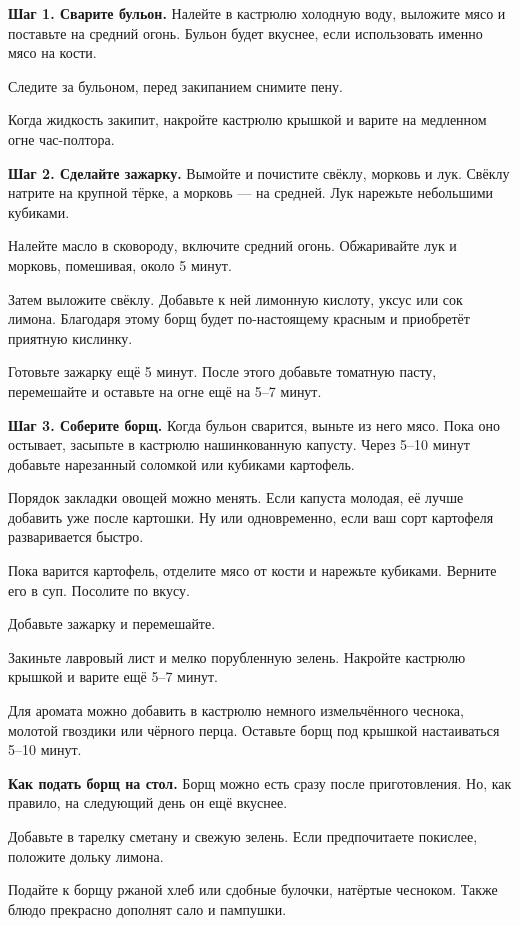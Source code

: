 \textbf{Шаг 1. Сварите бульон.} Налейте в кастрюлю холодную воду, выложите мясо и поставьте на средний огонь. Бульон будет вкуснее, если использовать именно мясо на кости.

Следите за бульоном, перед закипанием снимите пену.

Когда жидкость закипит, накройте кастрюлю крышкой и варите на медленном огне час-полтора.

\textbf{Шаг 2. Сделайте зажарку.}
Вымойте и почистите свёклу, морковь и лук. Свёклу натрите на крупной тёрке, а морковь — на средней. Лук нарежьте небольшими кубиками.

Налейте масло в сковороду, включите средний огонь. Обжаривайте лук и морковь, помешивая, около 5 минут.

Затем выложите свёклу. Добавьте к ней лимонную кислоту, уксус или сок лимона. Благодаря этому борщ будет по-настоящему красным и приобретёт приятную кислинку.

Готовьте зажарку ещё 5 минут. После этого добавьте томатную пасту, перемешайте и оставьте на огне ещё на 5–7 минут.

\textbf{Шаг 3. Соберите борщ.}
Когда бульон сварится, выньте из него мясо. Пока оно остывает, засыпьте в кастрюлю нашинкованную капусту. Через 5–10 минут добавьте нарезанный соломкой или кубиками картофель.

Порядок закладки овощей можно менять. Если капуста молодая, её лучше добавить уже после картошки. Ну или одновременно, если ваш сорт картофеля разваривается быстро.

Пока варится картофель, отделите мясо от кости и нарежьте кубиками. Верните его в суп. Посолите по вкусу.

Добавьте зажарку и перемешайте.

Закиньте лавровый лист и мелко порубленную зелень. Накройте кастрюлю крышкой и варите ещё 5–7 минут.

Для аромата можно добавить в кастрюлю немного измельчённого чеснока, молотой гвоздики или чёрного перца. Оставьте борщ под крышкой настаиваться 5–10 минут.

\textbf{Как подать борщ на стол.} Борщ можно есть сразу после приготовления. Но, как правило, на следующий день он ещё вкуснее.

Добавьте в тарелку сметану и свежую зелень. Если предпочитаете покислее, положите дольку лимона.

Подайте к борщу ржаной хлеб или сдобные булочки, натёртые чесноком. Также блюдо прекрасно дополнят сало и пампушки.